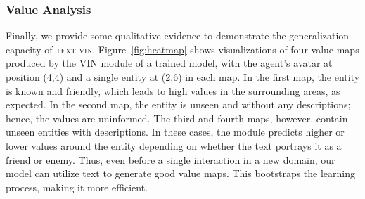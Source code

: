 \subsubsection{Value Analysis}
Finally, we provide some qualitative evidence to demonstrate the generalization capacity of \textsc{text-vin}. Figure~\ref{fig:heatmap} shows visualizations of four value maps produced by the VIN module of a trained model, with the agent's avatar at position (4,4) and a single entity at (2,6) in each map. In the first map, the entity is known and friendly, which leads to high values in the surrounding areas, as expected. In the second map, the entity is unseen and without any descriptions; hence, the values are uninformed. The third and fourth maps, however, contain unseen entities with descriptions. In these cases, the module predicts higher or lower values around the entity depending on whether the text portrays it as a friend or enemy. Thus, even before a single interaction in a new domain, our model can utilize text to generate good value maps. This bootstraps the learning process, making it more efficient.





